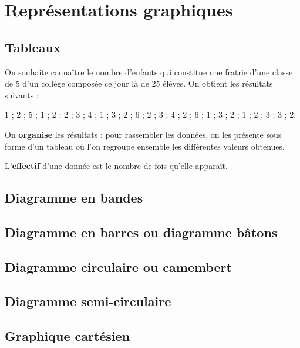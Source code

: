 \section{Représentations graphiques}
\subsection{Tableaux}

On souhaite connaître le nombre d'enfants qui constitue une fratrie d'une classe de 5 d'un collège composée ce jour là de 25 élèves. On obtient les résultats suivants :
   \begin{center}
      1 ; 2 ; 5 ; 1 ; 2 ; 2 ; 3 ; 4 ; 1 ; 3 ; 2 ; 6 ; 2 ; 3 ; 4 ; 2 ; 6 ; 1 ; 3 ; 2 ; 1 ; 2 ; 3 ; 3 ; 2.
   \end{center}
   
On {\bf organise} les résultats : pour rassembler les données, on les présente sous forme d'un tableau où l'on regroupe ensemble les différentes valeurs obtenues.

L'{\bf effectif} d'une donnée est le nombre de fois qu'elle apparaît.
\begin{center}
\end{center}

\subsection{Diagramme en bandes}

\subsection{Diagramme en barres ou diagramme bâtons}

\subsection{Diagramme circulaire ou camembert}

\subsection{Diagramme semi-circulaire}

\subsection{Graphique cartésien}